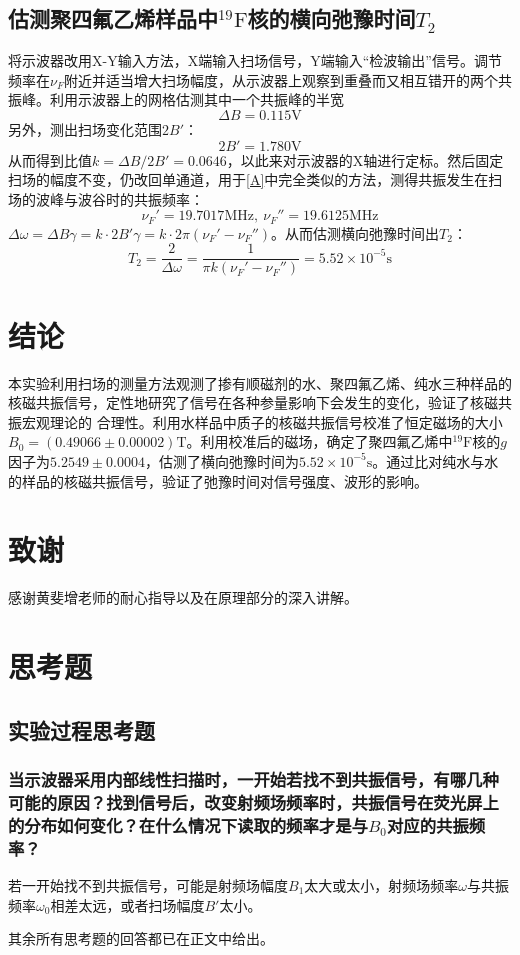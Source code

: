 \documentclass[aps,pre,12pt,preprint,onecolumn,showpacs,showkeys]{revtex4-1}
\def \F {^{19}\mathrm{F}}
\begin{document}
\subsection{估测聚四氟乙烯样品中$\F$核的横向弛豫时间$T_2$}
将示波器改用X-Y输入方法，X端输入扫场信号，Y端输入“检波输出”信号。调节频率在$\nu_F$附近并适当增大扫场幅度，从示波器上观察到重叠而又相互错开的两个共振峰。利用示波器上的网格估测其中一个共振峰的半宽
$$\Delta B=0.115 \mathrm{V}$$
另外，测出扫场变化范围$2B'$：
$$2B'=1.780 \mathrm{V}$$
从而得到比值$k=\Delta B /2B'=0.0646$，以此来对示波器的X轴进行定标。然后固定扫场的幅度不变，仍改回单通道，用于\ref{A}中完全类似的方法，测得共振发生在扫场的波峰与波谷时的共振频率：
\begin{equation}
\nu_F'=19.7017\mathrm{MHz}, \ \nu_F''=19.6125\mathrm{MHz}
\end{equation}
$\Delta \omega =\Delta B \gamma= k \cdot 2B' \gamma =k \cdot 2\pi (\nu_F'-\nu_F'')$。从而估测横向弛豫时间出$T_2$：
\begin{equation}
T_2=\frac{2}{\Delta \omega}=\frac{1}{\pi k (\nu_F'-\nu _F'')}=5.52\times 10 ^{-5}\mathrm{s}
\end{equation}
\section{结论}
本实验利用扫场的测量方法观测了掺有顺磁剂的水、聚四氟乙烯、纯水三种样品的核磁共振信号，定性地研究了信号在各种参量影响下会发生的变化，验证了核磁共振宏观理论的
合理性。利用水样品中质子的核磁共振信号校准了恒定磁场的大小$B_0 =(0.49066 \pm 0.00002 ) \mathrm{T}$。利用校准后的磁场，确定了聚四氟乙烯中$\F$核的$g$因子为$5.2549\pm0.0004$，估测了横向弛豫时间为$5.52\times 10 ^{-5}\mathrm{s}$。通过比对纯水与水的样品的核磁共振信号，验证了弛豫时间对信号强度、波形的影响。

\section{致谢}
感谢黄斐增老师的耐心指导以及在原理部分的深入讲解。

\appendix
\section{思考题}
\subsection{实验过程思考题}
\subsubsection{当示波器采用内部线性扫描时，一开始若找不到共振信号，有哪几种可能的原因？找到信号后，改变射频场频率时，共振信号在荧光屏上的分布如何变化？在什么情况下读取的频率才是与$B_0$对应的共振频率？}
若一开始找不到共振信号，可能是射频场幅度$B_1$太大或太小，射频场频率$\omega$与共振频率$\omega_0$相差太远，或者扫场幅度$B'$太小。

其余所有思考题的回答都已在正文中给出。
\end{document}
